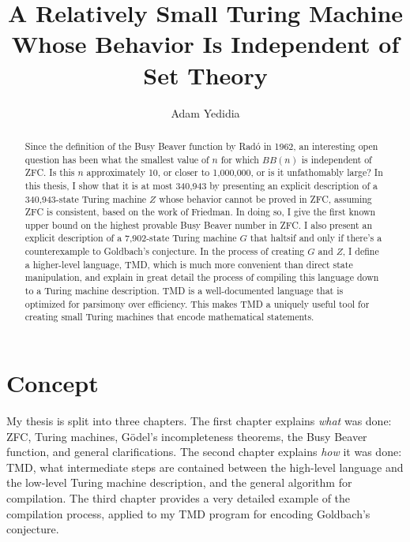 \documentclass[11pt]{report}
\newcommand{\statenumstate}{340,943-state }
\newcommand{\statenum}{340,943 }
\newcommand{\gbstatenumstate}{7,902-state }
\begin{document}
\title{A Relatively Small Turing Machine Whose Behavior Is Independent of Set Theory}
\author{Adam Yedidia}

\maketitle

\begin{abstract}

Since the definition of the Busy Beaver function by Rad\'{o} in 1962, an interesting open question has been what the smallest value of $n$ for which $BB(n)$ is independent of ZFC. Is this $n$ approximately 10, or closer to 1,000,000, or is it unfathomably large? In this thesis, I show that it is at most \statenum by presenting an explicit description of a \statenumstate Turing machine $Z$ whose behavior cannot be proved in ZFC, assuming ZFC is consistent, based on the work of Friedman. %
In doing so, I give the first known upper bound on the highest provable Busy Beaver number in ZFC. I also present an explicit description of a \gbstatenumstate Turing machine $G$ that haltsif and only if there's a counterexample to Goldbach's conjecture. In the process of creating $G$ and $Z$, I define a higher-level language, TMD, which is much more convenient than direct state manipulation, and explain in great detail the process of compiling this language down to a Turing machine description. TMD is a well-documented language that is optimized for parsimony over efficiency. This makes TMD a uniquely useful tool for creating small Turing machines that encode mathematical statements. 

\end{abstract}

\chapter{Concept}

My thesis is split into three chapters. The first chapter explains \emph{what} was done: ZFC, Turing machines, G\"{o}del's incompleteness theorems, the Busy Beaver function, and general clarifications. The second chapter explains \emph{how} it was done: TMD, what intermediate steps are contained between the high-level language and the low-level Turing machine description, and the general algorithm for compilation. The third chapter provides a very detailed example of the compilation process, applied to my TMD program for encoding Goldbach's conjecture.
\end{document}
